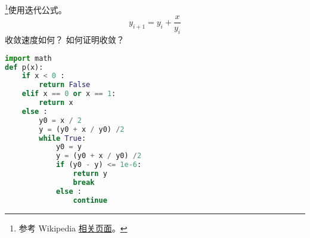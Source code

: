 
\begin{issues}
\issueDraft
\end{issues}

\footnote{参考 Wikipedia \href{https://en.wikipedia.org/wiki/Methods_of_computing_square_roots}{相关页面}。}使用迭代公式。
\begin{equation}
y_{i+1} = y_i + \frac{x}{y_i}
\end{equation}
收敛速度如何？ 如何证明收敛？

\begin{lstlisting}[language=python]
import math
def p(x):
    if x < 0 :
        return False
    elif x == 0 or x == 1:
        return x
    else :
        y0 = x / 2
        y = (y0 + x / y0) /2
        while True:
            y0 = y
            y = (y0 + x / y0) /2
            if (y0 - y) <= 1e-6:
                return y
                break
            else :
                continue
\end{lstlisting}
